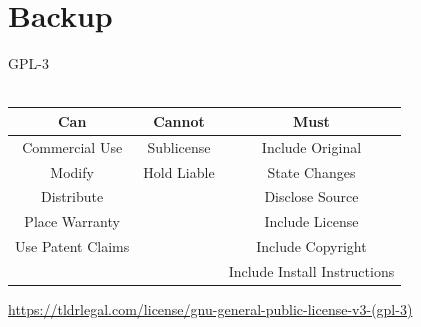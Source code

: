 
\section{Backup}




\begin{frame}{GPL-3}
	\\
	\\
	\begin{tabular}{|c|c|c|}
		\hline 
		Can & Cannot & Must \\ 
		\hline 
		Commercial Use & Sublicense & Include Original \\ 
		\hline 
		Modify & Hold Liable & State Changes \\ 
		\hline 
		Distribute &  & Disclose Source \\ 
		\hline 
		Place Warranty &  & Include License \\ 
		\hline 
		Use Patent Claims &  & Include Copyright \\ 
		\hline 
		&  & Include Install Instructions \\ 
		\hline 
	\end{tabular} 
\end{frame}
\note
{
	\url{https://tldrlegal.com/license/gnu-general-public-license-v3-(gpl-3)}
}

